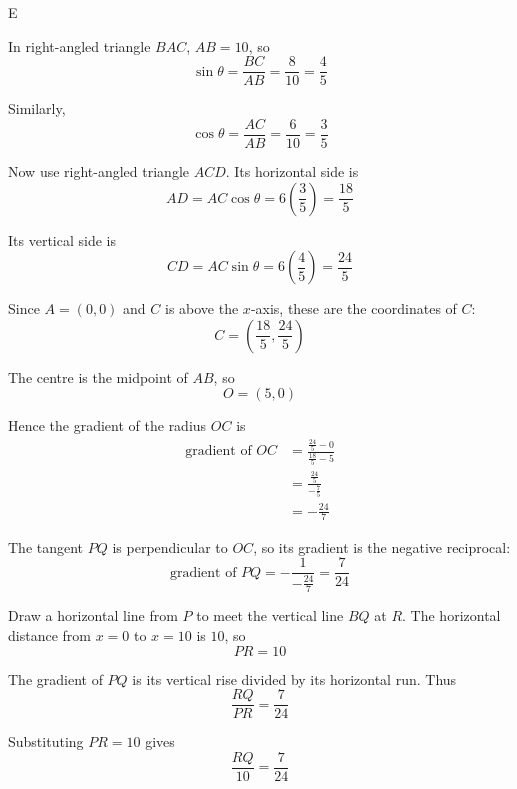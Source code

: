 \documentclass[11pt,a4paper]{article}
\begin{document}
\begin{enumerate}[label=\textbf{\arabic*.},leftmargin=*,itemsep=0pt,start=5]
\begin{djsSolution}{E}
\begin{djsSolutionFigure}
\end{djsSolutionFigure}

In right-angled triangle $BAC$, $AB=10$, so
\[
\sin\theta=\frac{BC}{AB}=\frac{8}{10}=\frac45
\]

Similarly,
\[
\cos\theta=\frac{AC}{AB}=\frac{6}{10}=\frac35
\]

Now use right-angled triangle $ACD$. Its horizontal side is
\[
AD=AC\cos\theta=6\left(\frac35\right)=\frac{18}{5}
\]

Its vertical side is
\[
CD=AC\sin\theta=6\left(\frac45\right)=\frac{24}{5}
\]

Since $A=(0,0)$ and $C$ is above the $x$-axis, these are the coordinates of $C$:
\[
C=\left(\frac{18}{5},\frac{24}{5}\right)
\]

The centre is the midpoint of $AB$, so
\[
O=(5,0)
\]

Hence the gradient of the radius $OC$ is
\[
\begin{aligned}
\text{gradient of }OC
&=\frac{\frac{24}{5}-0}{\frac{18}{5}-5}\\[8pt]
&=\frac{\frac{24}{5}}{-\frac75}\\[8pt]
&=-\frac{24}{7}
\end{aligned}
\]

The tangent $PQ$ is perpendicular to $OC$, so its gradient is the negative reciprocal:
\[
\text{gradient of }PQ=-\frac{1}{-\frac{24}{7}}=\frac{7}{24}
\]

Draw a horizontal line from $P$ to meet the vertical line $BQ$ at $R$. The horizontal distance from $x=0$ to $x=10$ is $10$, so
\[
PR=10
\]

The gradient of $PQ$ is its vertical rise divided by its horizontal run. Thus
\[
\frac{RQ}{PR}=\frac{7}{24}
\]

Substituting $PR=10$ gives
\[
\frac{RQ}{10}=\frac{7}{24}
\]


\end{djsSolution}
\end{enumerate}
\end{document}
